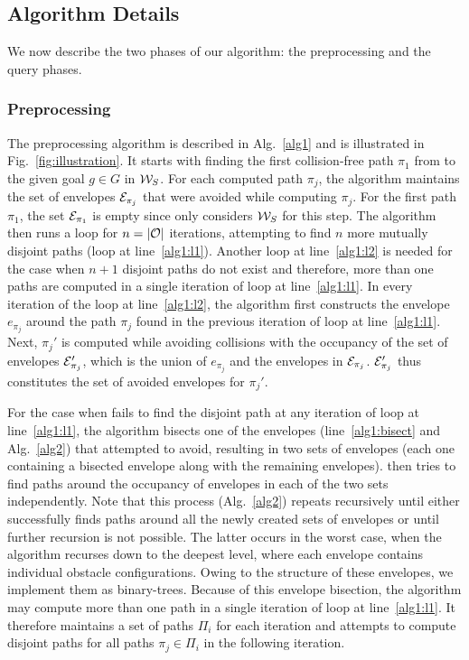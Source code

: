 \documentclass[a4paper]{report}
\begin{document}
\subsection{Algorithm Details}
We now describe the two phases of our algorithm: the preprocessing and the query phases.

\subsubsection{Preprocessing}
The preprocessing algorithm is described in Alg.~\ref{alg1} and is illustrated in Fig.~\ref{fig:illustration}. It starts with finding the first collision-free path $\pi_1$ from \Sstart to the given goal $g \in G$ in $\mathcal{W}_S$. For each computed path $\pi_j$, the algorithm maintains the set of envelopes $\mathcal{E}_{\pi_j}$ that were avoided while computing $\pi_j$. For the first path $\pi_1$, the set $\mathcal{E}_{\pi_1}$ is empty since \calP only considers $\mathcal{W}_S$ for this step. The algorithm then runs a loop for $n=|\mathcal{O}|$ iterations, attempting to find $n$ more mutually disjoint paths (loop at line~\ref{alg1:l1}). Another loop at line~\ref{alg1:l2} is needed for the case when $n+1$ disjoint paths do not exist and therefore, more than one paths are computed in a single iteration of loop at line~\ref{alg1:l1}.
In every iteration of the loop at line~\ref{alg1:l2}, the algorithm first constructs the envelope $e_{\pi_j}$ around the path $\pi_j$ found in the previous iteration of loop at line~\ref{alg1:l1}. Next, $\pi_j'$ is computed while avoiding collisions with the occupancy of the set of envelopes $\mathcal{E}_{\pi_j}'$, which is the union of $e_{\pi_j}$ and the envelopes in $\mathcal{E}_{\pi_j}$. $\mathcal{E}_{\pi_j}'$ thus constitutes the set of avoided envelopes for $\pi_j'.$

For the case when \calP fails to find the disjoint path at any iteration of loop at line~\ref{alg1:l1}, the algorithm bisects one of the envelopes (line~\ref{alg1:bisect} and Alg.~\ref{alg2}) that \calP attempted to avoid, resulting in two sets of envelopes (each one containing a bisected envelope along with the remaining envelopes). \calP then tries to find paths around the occupancy of envelopes in each of the two sets independently. Note that this process (Alg.~\ref{alg2}) repeats recursively until either \calP successfully finds paths around all the newly created sets of envelopes or until further recursion is not possible. The latter occurs in the worst case, when the algorithm recurses down to the deepest level, where each envelope contains individual obstacle configurations. Owing to the structure of these envelopes, we implement them as binary-trees. Because of this envelope bisection, the algorithm may compute more than one path in a single iteration of loop at line~\ref{alg1:l1}. It therefore maintains a set of paths $\Pi_i$ for each iteration and attempts to compute disjoint paths for all paths $\pi_j \in \Pi_i$ in the following iteration.
\end{document}
